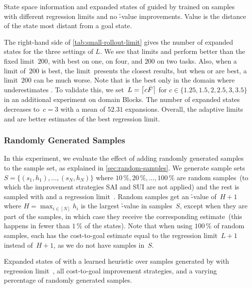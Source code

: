 \begin{table}[tb]
    \caption[State space information and expanded states with different regression limits.]{State space information and expanded states of \gbfs guided by \hnn trained on \bfsrw samples with different regression limits and no \h-value improvements. Value \ssdiameter is the distance of the state most distant from a goal state.}
    \label{tab:small-rollout-limit}
    \addmargin
    \centering
    
\end{table}

The right-hand side of \cref{tab:small-rollout-limit} gives the number of expanded states for the three settings of $L$. We see that limits \facts and \meanfx perform better than the fixed limit~$200$, with \facts best on one, \meanfx on four, and $200$ on two tasks. Also, when a limit of~$200$ is best, the limit~\facts presents the closest results, but when \facts or \meanfx are best, a limit~$200$ can be much worse. Note that \facts is the best only in the domain where \meanfx underestimates \ssdiameter. To validate this, we set~$L=\left\lceil c\bar F\right\rceil$ for $c\in\{1.25,1.5,2,2.5,3,3.5\}$ in an additional experiment on domain Blocks. The number of expanded states decreases to~$c=3$ with a mean of $52.31$ expansions. Overall, the adaptive limits \facts and \meanfx are better estimates of the best regression limit.

\subsubsection{Randomly Generated Samples}
\label{sec:small-exps-random-samples}

In this experiment, we evaluate the effect of adding randomly generated samples to the sample set, as explained in \cref{sec:random-samples}. We generate sample sets~$S=\{(s_1,h_1),\ldots,(s_N,h_N)\}$ where $10\,\%, 20\,\%,\ldots,100\,\%$ are random samples~(to which the improvement strategies SAI and SUI are not applied) and the rest is sampled with \bfsrw and a regression limit~\meanfx. Random samples get an \h-value of~$H+1$ where $H=\max_{i\in[N]} h_i$ is the largest \h-value in samples~$S$, except when they are part of the samples, in which case they receive the corresponding estimate~(this happens in fewer than $1\,\%$ of the states). Note that when using $100\,\%$ of random samples, each has the cost-to-goal estimate equal to the regression limit~$L+1$ instead of~$H+1$, as we do not have samples in~$S$.

\begin{table}[tb]
    \caption[Expanded states from a varying percentage of randomly generated samples.]{Expanded states of \gbfs with a learned heuristic over samples generated by \bfsrw with regression limit~\meanfx, all cost-to-goal improvement strategies, and a varying percentage of randomly generated samples.}
    \label{tab:small-random-samples}
    \addmargin
    \centering
    
\end{table}

